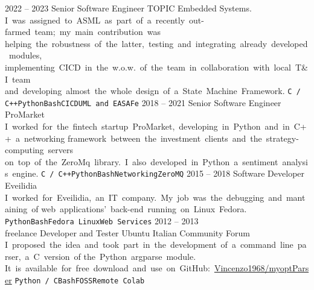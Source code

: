 \documentclass[9pt]{developercv} %
\begin{document}


\begin{entrylist}
	\entry
		{2022 -- 2023}
		{Senior Software Engineer}
		{TOPIC Embedded Systems.}
		{\mbox{I was assigned to ASML as part of a recently out-farmed team; my main contribution was} \linebreak \mbox{helping the robustness of the latter, testing and integrating already developed modules,}  \linebreak \mbox{implementing CICD in the w.o.w. of the team in collaboration with local T\&I team} 
		\linebreak
		\mbox{and developing almost the whole design of a State Machine Framework.} \linebreak \texttt{C / C++}\slashsep\texttt{Python}\slashsep\texttt{Bash}\slashsep\texttt{CICD}\slashsep\texttt{UML and EA}\slashsep\texttt{SAFe}}
	\entry
	    {2018 -- 2021}
	    {Senior Software Engineer}
	    {ProMarket}
	    {\mbox{I worked for the fintech startup ProMarket, developing in Python and in C++ a networking} \linebreak \mbox{framework between the investment clients and the strategy-computing
servers} \linebreak \mbox{on top of the ZeroMq library. I also developed in Python a sentiment analysis engine.} \linebreak \texttt{C / C++}\slashsep\texttt{Python}\slashsep\texttt{Bash}\slashsep\texttt{Networking}\slashsep\texttt{ZeroMQ}}
	\entry
		{2015 -- 2018} %
		{Software Developer}
		{Eveilidia}
        {\mbox{I worked for Eveilidia, an IT company. My job was the debugging and mantaining of} \linebreak  \mbox{web applications’ back-end
running on Linux Fedora.} \linebreak \texttt{Python}\slashsep\texttt{Bash}\slashsep\texttt{Fedora Linux}\slashsep\texttt{Web Services}}
	\entry
		{2012 -- 2013\\\footnotesize{freelance}}
		{Developer and Tester}
		{Ubuntu Italian Community Forum}
        {\mbox{I proposed the idea and took part in the development of a command line parser, a C version of} \linebreak \mbox{the Python argparse module.} 
         \linebreak \mbox{It is available for free download and use on GitHub: \href{https://github.com/Vincenzo1968/myoptParser}{Vincenzo1968/myoptParser}}
         \linebreak \texttt{Python / C}\slashsep\texttt{Bash}\slashsep\texttt{FOSS}\slashsep\texttt{Remote Colab}}


\end{entrylist}
\end{document}
